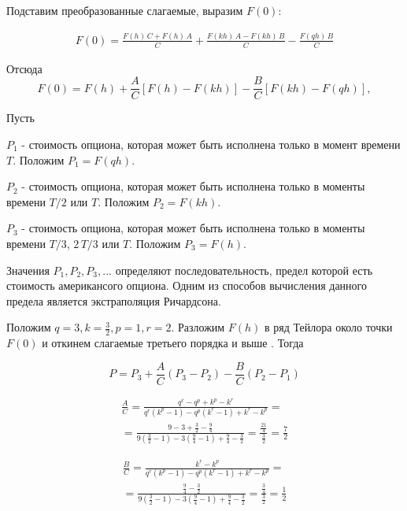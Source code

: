 \documentclass[oneside,final,12pt]{article}
\begin{document}
\bigskip
Подставим преобразованные слагаемые, выразим $F(0)$:

\bigskip
\begin{equation*}
\begin{gathered}
F(0) = \frac{F(h) \, C + F(h) \, A}{C} + \frac{F(kh) \, A - F(kh) \, B}{C} - \frac{F(qh) \, B}{C}
\end{gathered}
\end{equation*}

Отсюда
$$
F(0) = F(h) + \frac{A}{C}[F(h)-F(kh)] - \frac{B}{C} [F(kh)-F(qh)],
$$


\noindent Пусть

$P_1$ - стоимость опциона, которая может быть исполнена только в момент времени $T$. Положим $P_1 = F(qh)$.

$P_2$ - стоимость опциона, которая может быть исполнена только в моменты времени $T/2$ или $T$.  Положим $P_2 = F(kh)$.

$P_3$ - стоимость опциона, которая может быть исполнена только в моменты времени $T/3$, $2\,T/3$ или $T$.  Положим $P_3 = F(h)$.

Значения $P_1, P_2, P_3, ...$ определяют последовательность, предел которой есть стоимость американсого опциона. Одним из способов вычисления данного предела является экстраполяция Ричардсона.

Положим $q=3, k=\frac{3}{2}, p=1, r=2$. Разложим $F(h)$ в ряд Тейлора около точки $F(0)$ и откинем слагаемые третьего порядка и выше \cite{geske}. Тогда

$$
P = P_3 + \frac{A}{C} (P_3 - P_2) - \frac{B}{C} (P_2 - P_1)
$$

\begin{equation*}
\begin{gathered}
\frac{A}{C} = \frac{q^r - q^p + k^p - k^r}{q^r (k^p - 1) - q^p (k^r - 1) + k^r - k^p} = \\
= \frac{9-3+\frac{3}{2}-\frac{9}{4}}{9 (\frac{3}{2}-1) - 3 (\frac{9}{4}-1) + \frac{9}{4} - \frac{3}{2}} = \frac{\frac{21}{4}}{\frac{3}{2}} = \frac{7}{2}
\end{gathered}
\end{equation*}

\bigskip
\begin{equation*}
\begin{gathered}
\frac{B}{C} = \frac{k^r-k^p}{q^r (k^p - 1) - q^p (k^r - 1) + k^r - k^p} = \\
= \frac{\frac{9}{4} - \frac{3}{2}}{9 (\frac{3}{2}-1) - 3 (\frac{9}{4}-1) + \frac{9}{4} - \frac{3}{2}} = \frac{\frac{3}{4}}{\frac{3}{2}} = \frac{1}{2}
\end{gathered}
\end{equation*}
\end{document}
